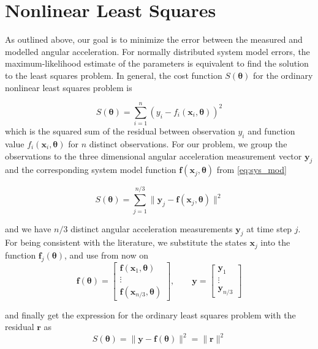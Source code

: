 \section{Nonlinear Least Squares}
As outlined above, our goal is to minimize the error between the measured and modelled angular acceleration.
For normally distributed system model errors, the maximum-likelihood estimate of the parameters \citep{Seber} is equivalent to find the solution to the least squares problem.
In general, the cost function $S(\boldsymbol{\theta})$ for the ordinary nonlinear least squares problem is

\begin{equation}
S(\boldsymbol{\theta}) = \sum_{i=1}^n ( y_i - f_i(\mathbf{x}_i, \boldsymbol{\theta}) )^2
\end{equation}
which is the squared sum of the residual between observation $y_i$ and function value $f_i(\mathbf{x}_i, \boldsymbol{\theta})$ for $n$ distinct observations.
For our problem, we group the observations to the three dimensional angular acceleration measurement vector $\mathbf{y}_j$ and the corresponding system model function $\mathbf{f}(\mathbf{x}_j, \boldsymbol{\theta})$ from \eqref{eq:sys_mod}

\begin{equation}
\label{eq:cost_f_x_theta}
S(\boldsymbol{\theta}) = \sum_{j=1}^{n/3} \| \mathbf{y}_j - \mathbf{f}(\mathbf{x}_j, \boldsymbol{\theta}) \|^2
\end{equation}

and we have $n/3$ distinct angular acceleration measurements $\mathbf{y}_j$ at time step $j$.
For being consistent with the literature, we substitute the states $\mathbf{x}_j$ into the function $\mathbf{f}_j(\boldsymbol{\theta})$, and use from now on
\begin{equation}
\mathbf{f}(\boldsymbol{\theta}) = \left[ \begin{array}{c}
\mathbf{f}(\mathbf{x}_1, \boldsymbol{\theta}) \\
\vdots \\
\mathbf{f}(\mathbf{x}_{n/3}, \boldsymbol{\theta})
\end{array} \right]
, \qquad
\mathbf{y} = \left[ \begin{array}{c}
\mathbf{y}_1 \\
\vdots \\
\mathbf{y}_{n/3} 
\end{array} \right]
\end{equation}

and finally get the expression for the ordinary least squares problem with the residual $\mathbf{r}$ as
\begin{equation}
\label{eq:cost_ols}
S(\boldsymbol{\theta}) = \| \mathbf{y} - \mathbf{f}(\boldsymbol{\theta}) \|^2 = \| \mathbf{r} \|^2
\end{equation}

